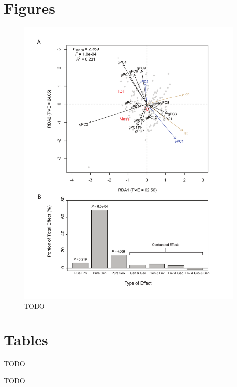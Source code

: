 \documentclass[smallextended]{svjour3}
\newcommand{\beginsupplement}{%
        \setcounter{table}{0}
        \renewcommand{\thetable}{S\arabic{table}}
        \setcounter{figure}{0}
        \renewcommand{\thefigure}{S\arabic{figure}}
        \renewcommand{\thesection}{S\arabic{section}}
        \renewcommand{\thesubsection}{S\arabic{subsection}}
     }
\begin{document}
\clearpage






\section*{Figures}
\begin{figure}[t]
\centering
\includegraphics[width=\textwidth]{rda_fig}
\caption{TODO}
\label{fig:rda}
\end{figure}

\section*{Tables}
TODO


\beginsupplement%
TODO
\end{document}
